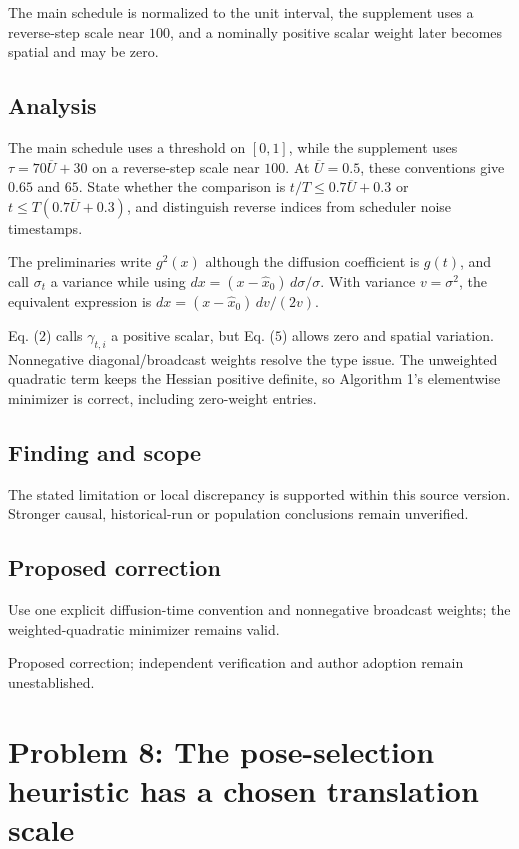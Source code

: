 \documentclass[11pt]{article}
\begin{document}
The main schedule is normalized to the unit interval, the supplement uses a reverse-step scale near \(100\), and a nominally positive scalar weight later becomes spatial and may be zero.

\subsection*{Analysis}

The main schedule uses a threshold on \([0,1]\), while the supplement uses \(\tau=70\overline U+30\) on a reverse-step scale near \(100\). At \(\overline U=0.5\), these conventions give \(0.65\) and \(65\). State whether the comparison is \(t/T\le0.7\overline U+0.3\) or \(t\le T(0.7\overline U+0.3)\), and distinguish reverse indices from scheduler noise timestamps.

The preliminaries write \(g^2(x)\) although the diffusion coefficient is \(g(t)\), and call \(\sigma_t\) a variance while using \(dx=(x-\widehat x_0)\,d\sigma/\sigma\). With variance \(v=\sigma^2\), the equivalent expression is \(dx=(x-\widehat x_0)\,dv/(2v)\).

Eq. (\(2\)) calls \(\gamma_{t,i}\) a positive scalar, but Eq. (\(5\)) allows zero and spatial variation. Nonnegative diagonal/broadcast weights resolve the type issue. The unweighted quadratic term keeps the Hessian positive definite, so Algorithm 1's elementwise minimizer is correct, including zero-weight entries.

\subsection*{Finding and scope}

The stated limitation or local discrepancy is supported within this source version. Stronger causal, historical-run or population conclusions remain unverified.

\subsection*{Proposed correction}

Use one explicit diffusion-time convention and nonnegative broadcast weights; the weighted-quadratic minimizer remains valid.

Proposed correction; independent verification and author adoption remain unestablished.

\section*{Problem 8: The pose-selection heuristic has a chosen translation scale}
\end{document}
